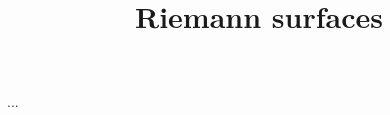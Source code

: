 \documentclass[]{report}
\title{Riemann surfaces}
\begin{document}
\maketitle
\tableofcontents

...

\end{document}
